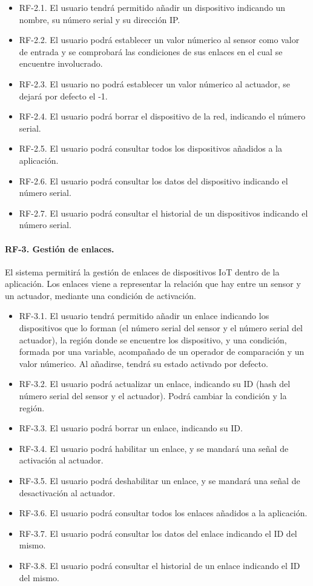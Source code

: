 \begin{itemize}
    \item[] RF-2.1. El usuario tendrá permitido añadir un dispositivo indicando un nombre, su número serial y su dirección
    IP.
    \item[] RF-2.2. El usuario podrá establecer un valor númerico al sensor como valor de entrada y se comprobará las 
    condiciones de sus enlaces en el cual se encuentre involucrado.
    \item[] RF-2.3. El usuario no podrá establecer un valor númerico al actuador, se dejará por defecto el -1.
    \item[] RF-2.4. El usuario podrá borrar el dispositivo de la red, indicando el número serial.
    \item[] RF-2.5. El usuario podrá consultar todos los dispositivos añadidos a la aplicación.
    \item[] RF-2.6. El usuario podrá consultar los datos del dispositivo indicando el número serial.
    \item[] RF-2.7. El usuario podrá consultar el historial de un dispositivos indicando el número serial.
\end{itemize}

\paragraph{RF-3. Gestión de enlaces.} El sistema permitirá la gestión de enlaces de dispositivos IoT dentro de la 
aplicación. Los enlaces  viene a representar la relación que hay entre un sensor y un actuador, mediante una condición de 
activación.

\begin{itemize}
    \item[] RF-3.1. El usuario tendrá permitido añadir un enlace indicando los dispositivos que lo forman (el número 
    serial del sensor y el número serial del actuador), la región donde se encuentre los dispositivo, y una condición, 
    formada por una variable, acompañado de un operador de comparación y un valor númerico. Al añadirse, tendrá su estado 
    activado por defecto.
    \item[] RF-3.2. El usuario podrá actualizar un enlace, indicando su ID (hash del número serial del sensor y el 
    actuador). Podrá cambiar la condición y la región.
    \item[] RF-3.3. El usuario podrá borrar un enlace, indicando su ID.
    \item[] RF-3.4. El usuario podrá habilitar un enlace, y se mandará una señal de activación al actuador. 
    \item[] RF-3.5. El usuario podrá deshabilitar un enlace, y se mandará una señal de desactivación al actuador.
    \item[] RF-3.6. El usuario podrá consultar todos los enlaces añadidos a la aplicación.
    \item[] RF-3.7. El usuario podrá consultar los datos del enlace indicando el ID del mismo.
    \item[] RF-3.8. El usuario podrá consultar el historial de un enlace indicando el ID del mismo.
\end{itemize}

